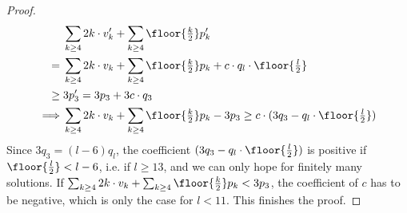 \begin{theorem}
\begin{proof}
    \begin{align*}
      &\sum_{k \geq 4} 2k \cdot v'_k + \sum_{k \geq 4} \floor{\tfrac{k}{2}} p'_k \\
      ={}&\sum_{k \geq 4} 2k \cdot v_k + \sum_{k \geq 4} \floor{\tfrac{k}{2}} p_k + c \cdot q_l \cdot \floor{\tfrac{l}{2}}\\
      \geq{} & 3 p'_3 {}={} 3 p_3 + 3 c \cdot q_3 \\
      \implies & \sum_{k \geq 4} 2k \cdot v_k + \sum_{k \geq 4} \floor{\tfrac{k}{2}} p_k - 3p_3 \geq c \cdot (3 q_3 - q_l \cdot \floor{\tfrac{l}{2}})
    \end{align*}
    Since $3q_3 = (l - 6)q_l$, the coefficient $(3 q_3 - q_l \cdot \floor{\tfrac{l}{2}})$ is positive if $\floor{\frac{l}{2}} < l - 6$, i.e. if $l \geq 13$, and we can only hope for finitely many solutions. If $\sum_{k \geq 4} 2k \cdot v_k + \sum_{k \geq 4} \floor{\tfrac{k}{2}} p_k < 3p_3$, the coefficient of $c$ has to be negative, which is only the case for $l < 11$. This finishes the proof.
  \end{proof}
\end{theorem}


